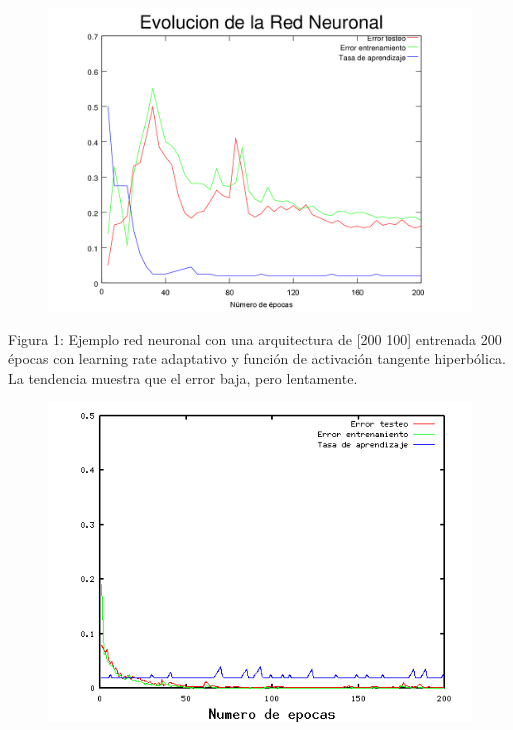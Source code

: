 \documentclass[%
    final,
    reprint,
    notitlepage,
    narroweqnarray,
    inline,
    twoside,
    invited
    ]{ieee}
\begin{document}
\begin{figure}[H]
\begin{center}
\includegraphics[scale=0.70]{./images/6.png}
\label{modelado}
\end{center}
\end{figure}

\begin{center}
\par Figura 1: Ejemplo red neuronal con una arquitectura de [200 100] entrenada 200 épocas con learning rate adaptativo y función de activación tangente hiperbólica.  
La tendencia muestra que el error baja, pero lentamente.
\end{center}

\begin{figure}[H]
\begin{center}
\includegraphics[scale=0.70]{./images/nice.png}
\label{modelado}
\end{center}
\end{figure}
\end{document}

